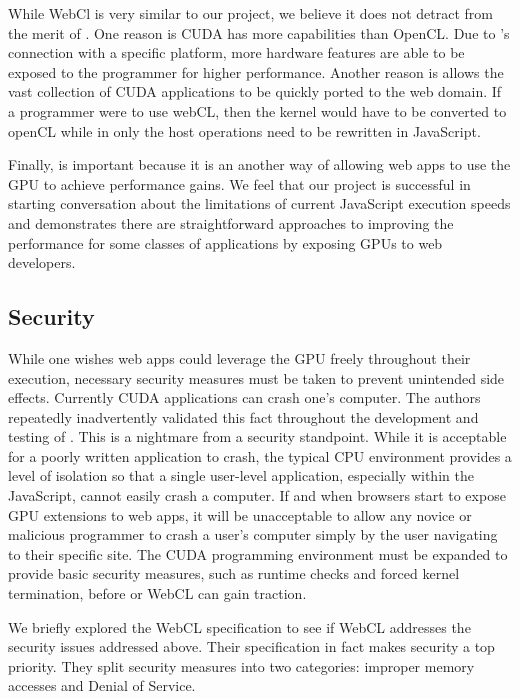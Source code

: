 While WebCl is very similar to our project, we believe it does not detract from
the merit of \namens. One reason is CUDA has more capabilities than OpenCL. Due
to \namens's connection with a specific platform, more hardware features are
able to be exposed to the programmer for higher performance. Another reason is
\name allows the vast collection of CUDA applications to be quickly ported to
the web domain. If a programmer were to use webCL, then the kernel would have to
be converted to openCL while in \name only the host operations need to be
rewritten in JavaScript.

Finally, \name is important because it is an another way of allowing web apps
to use the GPU to achieve performance gains. We feel that our project is
successful in starting conversation about the limitations of current JavaScript
execution speeds and demonstrates there are straightforward approaches to
improving the performance for some  classes of applications by exposing GPUs to
web developers.



\subsection{Security} \label{security} While one wishes web apps could leverage
the GPU freely throughout their execution, necessary security measures must be
taken to prevent unintended side effects. Currently CUDA applications can crash
one's computer.  The authors repeatedly inadvertently validated this fact
throughout the development and testing of \namens. This is a nightmare from a
security standpoint. While it is acceptable for a poorly written application to
crash, the typical CPU environment provides a level of isolation so that a
single user-level application, especially within the JavaScript, cannot easily
crash a computer. If and when browsers start to expose GPU extensions to web
apps, it will be unacceptable to allow any novice or malicious programmer to
crash a user's computer simply by the user navigating to their specific site.
The CUDA programming environment must be expanded to provide basic security
measures, such as runtime checks and forced kernel termination, before \name or
WebCL can gain traction.

We briefly explored the WebCL specification to see if WebCL addresses the
security issues addressed above. Their specification in fact makes security a
top priority. They split security measures into two categories: improper memory
accesses and Denial of Service.

